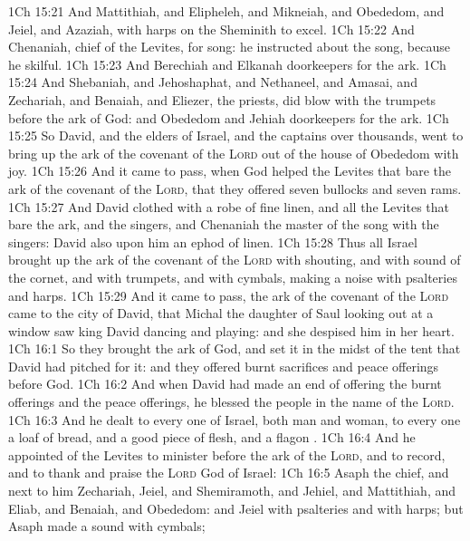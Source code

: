 \vs 1Ch 15:21 And Mattithiah, and Elipheleh, and Mikneiah, and Obededom, and Jeiel, and Azaziah, with harps on the Sheminith to excel.
\vs 1Ch 15:22 And Chenaniah, chief of the Levites,  for song: he instructed about the song, because he  skilful.
\vs 1Ch 15:23 And Berechiah and Elkanah  doorkeepers for the ark.
\vs 1Ch 15:24 And Shebaniah, and Jehoshaphat, and Nethaneel, and Amasai, and Zechariah, and Benaiah, and Eliezer, the priests, did blow with the trumpets before the ark of God: and Obededom and Jehiah  doorkeepers for the ark.
\vs 1Ch 15:25 So David, and the elders of Israel, and the captains over thousands, went to bring up the ark of the covenant of the \textsc{Lord} out of the house of Obededom with joy.
\vs 1Ch 15:26 And it came to pass, when God helped the Levites that bare the ark of the covenant of the \textsc{Lord}, that they offered seven bullocks and seven rams.
\vs 1Ch 15:27 And David  clothed with a robe of fine linen, and all the Levites that bare the ark, and the singers, and Chenaniah the master of the song with the singers: David also  upon him an ephod of linen.
\vs 1Ch 15:28 Thus all Israel brought up the ark of the covenant of the \textsc{Lord} with shouting, and with sound of the cornet, and with trumpets, and with cymbals, making a noise with psalteries and harps.
\vs 1Ch 15:29 And it came to pass,  the ark of the covenant of the \textsc{Lord} came to the city of David, that Michal the daughter of Saul looking out at a window saw king David dancing and playing: and she despised him in her heart.
\vs 1Ch 16:1 So they brought the ark of God, and set it in the midst of the tent that David had pitched for it: and they offered burnt sacrifices and peace offerings before God.
\vs 1Ch 16:2 And when David had made an end of offering the burnt offerings and the peace offerings, he blessed the people in the name of the \textsc{Lord}.
\vs 1Ch 16:3 And he dealt to every one of Israel, both man and woman, to every one a loaf of bread, and a good piece of flesh, and a flagon .
\vs 1Ch 16:4 And he appointed  of the Levites to minister before the ark of the \textsc{Lord}, and to record, and to thank and praise the \textsc{Lord} God of Israel:
\vs 1Ch 16:5 Asaph the chief, and next to him Zechariah, Jeiel, and Shemiramoth, and Jehiel, and Mattithiah, and Eliab, and Benaiah, and Obededom: and Jeiel with psalteries and with harps; but Asaph made a sound with cymbals;
